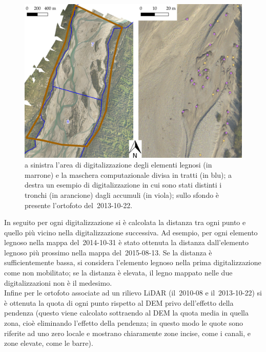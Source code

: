 \begin{figure}
	\centering
	\includegraphics[width = \textwidth]{files/digitalizzazione_legno.jpeg}
	\caption[area di digitalizzazione degli elementi legnosi]{a sinistra l'area di digitalizzazione degli elementi legnosi (in marrone) e la maschera computazionale divisa in tratti (in blu); a destra un esempio di digitalizzazione in cui sono stati distinti i tronchi (in arancione) dagli accumuli (in viola); sullo sfondo è presente l'ortofoto del~2013-10-22.}
	\label{fig:digitalizzazione-legno}
\end{figure}
%

In seguito per ogni digitalizzazione si è calcolata la distanza tra ogni punto e quello più vicino nella digitalizzazione successiva. Ad esempio, per ogni elemento legnoso nella mappa del~2014-10-31 è stato ottenuta la distanza dall'elemento legnoso più prossimo nella mappa del~2015-08-13.
Se la distanza è sufficientemente bassa, si considera l'elemento legnoso nella prima digitalizzazione come non mobilitato; se la distanza è elevata, il legno mappato nelle due digitalizzazioni non è il medesimo.
\\
Infine per le ortofoto associate ad un rilievo LiDAR (il~2010-08 e il~2013-10-22) si è ottenuta la quota di ogni punto rispetto al DEM privo dell'effetto della pendenza (questo viene calcolato sottraendo al DEM la quota media in quella zona, cioè eliminando l'effetto della pendenza; in questo modo le quote sono riferite ad uno zero locale e mostrano chiaramente zone incise, come i canali, e zone elevate, come le barre).
